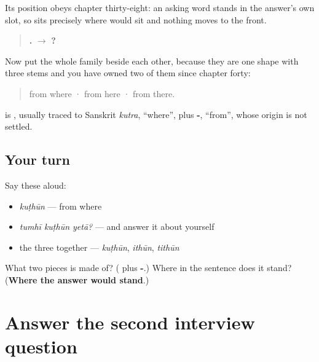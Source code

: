 Its position obeys chapter thirty-eight: an asking word stands in the answer's own slot, so \textbf{} sits precisely where \textbf{} would sit and nothing moves to the front.

\begin{quote}
\textbf{  .} $\to$ \textbf{  ?}
\end{quote}

Now put the whole family beside each other, because they are one shape with three stems and you have owned two of them since chapter forty:

\begin{quote}
\textbf{} from where · \textbf{} from here · \textbf{} from there.
\end{quote}

\begin{cousinweb}
\textbf{} is \textbf{}, usually traced to Sanskrit \emph{kutra}, \textquotedblleft{}where\textquotedblright{}, plus \textbf{-}, \textquotedblleft{}from\textquotedblright{}, whose origin is not settled.
\end{cousinweb}

\subsection*{Your turn}
Say these aloud:

\begin{itemize}
\raggedright
  \item \emph{kuṭhūn} — from where
  \item \emph{tumhī kuṭhūn yetā?} — and answer it about yourself
  \item the three together — \emph{kuṭhūn}, \emph{ithūn}, \emph{tithūn}
\end{itemize}

\begin{tcolorbox}[breakable,colback=teal!4,colframe=teal!35!black,title={Before you move on}]
What two pieces is \textbf{} made of? (\textbf{} plus \textbf{-}.) Where in the sentence does it stand? (\textbf{Where the answer would stand}.)
\end{tcolorbox}
\section[\texorpdfstring{\mr{कुठून}? — \mr{पुण्याहून}. (kuṭhūn? — puṇyāhūn.)}{कुठून? — पुण्याहून. (kuṭhūn? — puṇyāhūn.)}]{Answer the second interview question}

